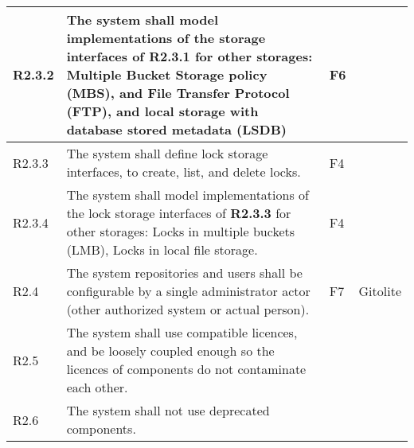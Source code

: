 \begin{landscape}
\begin{longtable}{|p{1cm}|p{19cm}|p{2cm}|p{3cm}|}
        R2.3.2                              & The system shall model implementations of the storage interfaces of \textbf{R2.3.1} for other storages: Multiple Bucket Storage policy (MBS), and File Transfer Protocol (FTP), and local storage with database stored metadata (LSDB)                                                & F6                    &                                          \\\hline
        R2.3.3                              & The system shall define lock storage interfaces, to create, list, and delete locks.                                                                                                                                                                                                   & F4                    &                                          \\\hline
        R2.3.4                              & The system shall model implementations of the lock storage interfaces of \textbf{R2.3.3} for other storages: Locks in multiple buckets (LMB), Locks in local file storage.                                                                                                            & F4                    &                                          \\\hline
        \rowcolor[HTML]{DDDDDD}        R2.4 & The system repositories and users shall be configurable by a single administrator actor (other authorized system or actual person).                                                                                                                                                   & F7                    & Gitolite                                 \\ \hline
        \rowcolor[HTML]{DDDDDD}        R2.5 & The system shall use compatible licences, and be loosely coupled enough so the licences of components do not contaminate each other.                                                                                                                                                  &                       &                                          \\ \hline
        \rowcolor[HTML]{DDDDDD}        R2.6 & The system shall not use deprecated components.                                                                                                                                                                                                                                       &                       &                                          \\ \hline

\end{longtable}
\end{landscape}
